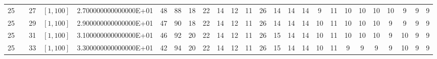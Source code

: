 \documentclass{article}
\begin{document}
\begin{landscape}
\begin{longtable}{ccccccccccccccccccccccccc}
  25 &  & 27         & $[1,100]$ & 2.700000000000000E+01 & \cellcolor{red!5} 48        &\cellcolor{red!75} 88        &\cellcolor{red!5} 18        &\cellcolor{red!5} 22        &\cellcolor{green!5} 14        &\cellcolor{green!5} 12        &\cellcolor{green!5} 11        &\cellcolor{red!5} 26        &\cellcolor{green!5} 14        &\cellcolor{green!5} 14        &\cellcolor{green!5} 14        &\cellcolor{green!25} 9         &\cellcolor{green!5} 11        &\cellcolor{green!5} 10        &\cellcolor{green!5} 10        &\cellcolor{green!5} 10        &\cellcolor{green!5} 10        &\cellcolor{green!25} 9         &\cellcolor{green!25} 9         &\cellcolor{green!25} 9\\
  25 &  & 29         & $[1,100]$ & 2.900000000000000E+01 & \cellcolor{red!5} 47        &\cellcolor{red!75} 90        &\cellcolor{red!5} 18        &\cellcolor{red!5} 22        &\cellcolor{green!5} 14        &\cellcolor{green!5} 12        &\cellcolor{green!5} 11        &\cellcolor{red!5} 26        &\cellcolor{green!5} 14        &\cellcolor{green!5} 14        &\cellcolor{green!5} 14        &\cellcolor{green!5} 10        &\cellcolor{green!5} 11        &\cellcolor{green!5} 10        &\cellcolor{green!5} 10        &\cellcolor{green!5} 10        &\cellcolor{green!25} 9         &\cellcolor{green!25} 9         &\cellcolor{green!25} 9         &\cellcolor{green!25} 9\\
  25 &  & 31         & $[1,100]$ & 3.100000000000000E+01 & \cellcolor{red!5} 46        &\cellcolor{red!75} 92        &\cellcolor{red!5} 20        &\cellcolor{red!5} 22        &\cellcolor{green!5} 14        &\cellcolor{green!5} 12        &\cellcolor{green!5} 11        &\cellcolor{red!5} 26        &15        &\cellcolor{green!5} 14        &\cellcolor{green!5} 14        &\cellcolor{green!5} 10        &\cellcolor{green!5} 11        &\cellcolor{green!5} 10        &\cellcolor{green!5} 10        &\cellcolor{green!5} 10        &\cellcolor{green!25} 9         &\cellcolor{green!5} 10        &\cellcolor{green!25} 9         &\cellcolor{green!25} 9\\
  25 &  & 33         & $[1,100]$ & 3.300000000000000E+01 & \cellcolor{red!5} 42        &\cellcolor{red!75} 94        &\cellcolor{red!5} 20        &\cellcolor{red!5} 22        &\cellcolor{green!5} 14        &\cellcolor{green!5} 12        &\cellcolor{green!5} 11        &\cellcolor{red!5} 26        &15        &\cellcolor{green!5} 14        &\cellcolor{green!5} 14        &\cellcolor{green!5} 10        &\cellcolor{green!5} 11        &\cellcolor{green!25} 9         &\cellcolor{green!25} 9         &\cellcolor{green!25} 9         &\cellcolor{green!25} 9         &\cellcolor{green!5} 10        &\cellcolor{green!25} 9         &\cellcolor{green!25} 9\\\hline

\end{longtable}
\end{landscape}
\end{document}
